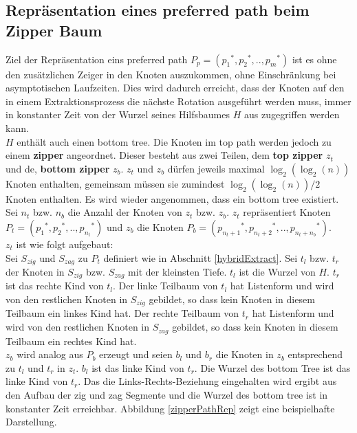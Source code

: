 \documentclass[a4paper,12pt]{article}
\begin{document}
\subsection{Repräsentation eines preferred path beim Zipper Baum}
Ziel der Repräsentation eins preferred path $P_p = \left({p_1}^*,{p_2}^*,..,{p_m}^*\right)$ ist es ohne den zusätzlichen Zeiger in den Knoten auszukommen, ohne Einschränkung bei asymptotischen Laufzeiten. Dies wird dadurch erreicht, dass der Knoten auf den in einem Extraktionsprozess die nächste Rotation ausgeführt werden muss, immer in konstanter Zeit von der Wurzel seines Hilfsbaumes $H$ aus zugegriffen werden kann.\\
$H$ enthält auch einen bottom tree. Die Knoten im top path werden jedoch zu einem \textbf{zipper} angeordnet. Dieser besteht aus zwei Teilen, dem \textbf{top zipper} $z_t$ und de, \textbf{bottom zipper} $z_b$. $z_t$ und $z_b$ dürfen jeweils maximal $\log_2\left(\log_2\left(n\right)\right)$ Knoten enthalten, gemeinsam müssen sie zumindest $\log_2\left(\log_2\left(n\right)\right) / 2$ Knoten enthalten. Es wird wieder angenommen, dass ein bottom tree existiert. Sei $n_t$ bzw. $n_b$ die Anzahl der Knoten von $z_t$ bzw. $z_b$. $z_t$ repräsentiert Knoten  $P_t = \left({p_1}^*,{p_2}^*,..,{p_{n_t}}^*\right)$ und $z_b$ die Knoten  $P_b =\left( {p_{n_t + 1}}^*,{p_{n_t + 2}}^*,..,{p_{n_t + n_b}}^*\right)$. \\
$z_t$ ist wie folgt aufgebaut:\\
Sei $S_{zig}$ und $S_{zag}$ zu $P_t$ definiert wie in Abschnitt \ref{hybridExtract}.
Sei $t_l$ bzw. $t_r$ der Knoten in $S_{zig}$ bzw. $S_{zag}$ mit der kleinsten Tiefe. $t_l$ ist die Wurzel von $H$. $t_r$ ist das rechte Kind von $t_l$. Der linke Teilbaum von $t_l$  hat Listenform und  wird von den restlichen Knoten in $S_{zig}$ gebildet, so dass kein Knoten in diesem Teilbaum ein linkes Kind hat. Der rechte Teilbaum von $t_r$  hat Listenform und  wird von den restlichen Knoten in $S_{zag}$ gebildet, so dass kein Knoten in diesem Teilbaum ein rechtes Kind hat. \\
$z_b$ wird analog aus $P_b$ erzeugt und seien $b_l$ und $b_r$ die Knoten in $z_b$ entsprechend zu $t_l$ und $t_r$ in $z_t$. $b_l$ ist das linke Kind von $t_r$. Die Wurzel des bottom Tree ist das linke Kind von $t_r$. Das die Links-Rechts-Beziehung eingehalten wird ergibt aus den Aufbau der zig und zag Segmente und die Wurzel des bottom tree ist in konstanter Zeit erreichbar. Abbildung \ref{zipperPathRep} zeigt eine beispielhafte Darstellung. 
\end{document}
